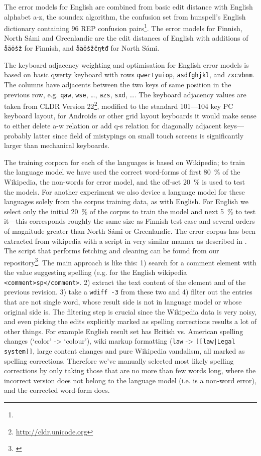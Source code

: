 \documentclass[a4paper,12pt]{article}
\begin{document}
The error models for English are combined from basic edit distance with English
alphabet a-z, the soundex algorithm, the confusion set from hunspell's English
dictionary containing 96 REP confusion pairs\footnote{}.
The error models for Finnish, North Sámi and Greenlandic are the edit distances
of English with additions of \texttt{åäöšž} for Finnish, and \texttt{åäöšžčŋŧđ}
for North Sámi.

The keyboard adjacency weighting and optimisation for English error models is
based on basic qwerty keyboard with rows \texttt{qwertyuiop},
\texttt{asdfghjkl}, and \texttt{zxcvbnm}. The columns have adjacents between
the two keys of same position in the previous row, e.g. \texttt{qaw},
\texttt{wse}, \ldots, \texttt{azs}, \texttt{sxd}, \ldots.  The keyboard
adjacency values are taken from CLDR Version
22\footnote{\url{http://cldr.unicode.org}}, modified to the standard 101---104
key PC keyboard layout, for Androids or other grid layout keyboards it would
make sense to either delete a-w relation or add q-s relation for diagonally
adjacent keys---probably latter since field of mistypings on small touch
screens is significantly larger than mechanical keyboards.

The training corpora for each of the languages is based on Wikipedia; to train
the language model we have used the correct word-forms of first 80~\% of the
Wikipedia, the non-words for error model, and the off-set 20~\% is used to test
the models. For another experiment we also device a language model for these
languages solely from the corpus training data, as with English.  For English
we select only the initial 20~\% of the corpus to train the model and next 5~\%
to test  it---this corresponds roughly
the same size as Finnish test case and several orders of magnitude greater than
North Sámi or Greenlandic. The error corpus has been extracted from wikipedia
with a script in very similar manner as described in \cite{max2010mining}. The
script that performs fetching and cleaning can be found from our
repository\footnote{\url{}}. The main approach is like this: 1) search for a
comment element with the value suggesting spelling (e.g. for the English
wikipedia \texttt{<comment>sp</comment>}. 2) extract the text content of the
element and of the previous revision. 3) take a \texttt{wdiff -3} from these
two and 4) filter out the entries that are not single word, whose result side
is not in language model or whose original side is.  The filtering step is
crucial since the Wikipedia data is very noisy, and even picking the edits
explicitly marked as spelling corrections results a lot of other things. For
example English result set has British vs.  American spelling changes (`color'
-> `colour'), wiki markup formatting (\texttt{law} -> \texttt{[[law|Legal
system]]}, large content changes and pure Wikipedia vandalism, all marked as
spelling corrections. Therefore we've manually selected most likely spelling
corrections by only taking those that are no more than few words long, where
the incorrect version does not belong to the language model (i.e. is a non-word
error), and the corrected word-form does.
\end{document}
